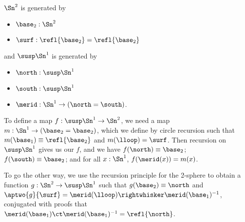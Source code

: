  \soln
$\Sn^{2}$ is generated by



\begin{itemize}
\item  $\base_{2} : \Sn^{2}$

\item  $\surf : \refl{\base_{2}} = \refl{\base_{2}}$

\end{itemize}
and $\susp\Sn^{1}$ is generated by



\begin{itemize}
\item  $\north : \susp\Sn^{1}$

\item  $\south : \susp\Sn^{1}$

\item  $\merid : \Sn^{1} \to (\north = \south)$.

\end{itemize}
To define a map $f : \susp\Sn^{1} \to \Sn^{2}$, we need a map $m : \Sn^{1} \to
(\base_{2} = \base_{2})$, which we define by circle recursion such that
$m(\base_{1}) \equiv \refl{\base_{2}}$ and $m(\lloop) = \surf$.  Then recursion
on $\susp\Sn^{1}$ gives us our $f$, and we have $f(\north) \equiv \base_{2}$;
$f(\south) \equiv \base_{2}$; and for all $x : \Sn^{1}$, $f(\merid(x)) = m(x)$.


To go the other way, we use the recursion principle for the 2-sphere to obtain
a function $g : \Sn^{2} \to \susp\Sn^{1}$ such that $g(\base_{2}) \equiv
\north$ and $\aptwo{g}{\surf} = \merid(\lloop) \rightwhisker \merid(\base_{1})^{-1}$,
conjugated with proofs that $\merid(\base_{1}) \ct \merid(\base_{1})^{-1} =
\refl{\north}$.



